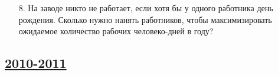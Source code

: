 \begin{enumerate}
\item[8.]
На заводе никто не работает, если хотя бы у одного работника день рождения.
Сколько нужно нанять работников, чтобы максимизировать ожидаемое количество
рабочих человеко-дней в году?



\end{enumerate}



\newpage
\subsection[2010-2011]{\hyperref[sec:sol_kr_02_2010_2011]{2010-2011}}
\label{sec:kr_02_2010_2011}

